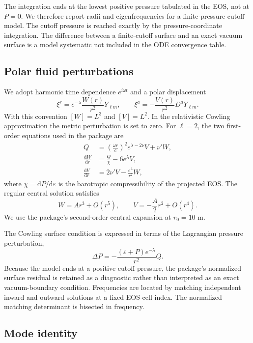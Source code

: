 \documentclass[aps,prd,twocolumn,superscriptaddress,nofootinbib]{revtex4-2}
\newcommand{\eps}{\varepsilon}
\newcommand{\dd}{\mathrm{d}}
\begin{document}
The integration ends at the lowest positive pressure tabulated in the EOS, not at $P=0$. We therefore report radii and eigenfrequencies for a finite-pressure cutoff model. The cutoff pressure is reached exactly by the pressure-coordinate integration. The difference between a finite-cutoff surface and an exact vacuum surface is a model systematic not included in the ODE convergence table.

\subsection{Polar fluid perturbations}

We adopt harmonic time dependence $e^{i\omega t}$ and a polar displacement
\begin{equation}
\xi^r=e^{-\lambda}\frac{W(r)}{r^2}Y_{\ell m},\qquad
\xi^a=-\frac{V(r)}{r^2}D^aY_{\ell m}.
\end{equation}
With this convention $[W]=L^3$ and $[V]=L^2$. In the relativistic Cowling approximation the metric perturbation is set to zero. For $\ell=2$, the two first-order equations used in the package are
\begin{align}
Q&=\left(\frac{\omega r}{c}\right)^2e^{\lambda-2\nu}V
       +\nu'W,\label{eq:Q}\\
\frac{\dd W}{\dd r}&=\frac{Q}{\chi}-6e^\lambda V,\label{eq:W}\\
\frac{\dd V}{\dd r}&=2\nu'V-\frac{e^\lambda}{r^2}W,\label{eq:V}
\end{align}
where $\chi=\dd P/\dd\eps$ is the barotropic compressibility of the projected EOS. The regular central solution satisfies
\begin{equation}
W=A r^3+O(r^5),\qquad V=-\frac{A}{2}r^2+O(r^4).
\end{equation}
We use the package's second-order central expansion at $r_0=10$ m.

The Cowling surface condition is expressed in terms of the Lagrangian pressure perturbation,
\begin{equation}
\Delta P=-\frac{(\eps+P)e^{-\lambda}}{r^2}Q.
\end{equation}
Because the model ends at a positive cutoff pressure, the package's normalized surface residual is retained as a diagnostic rather than interpreted as an exact vacuum-boundary condition. Frequencies are located by matching independent inward and outward solutions at a fixed EOS-cell index. The normalized matching determinant is bisected in frequency.

\subsection{Mode identity}
\end{document}

